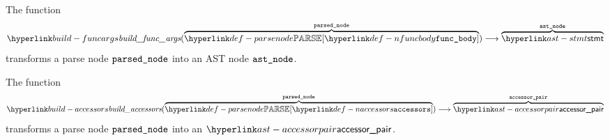 \hypertarget{build-funcbody}{}
The function
\[
\buildfuncargs(\overname{\parsenode{\Nfuncbody}}{\vparsednode}) \aslto
  \overname{\stmt}{\vastnode}
\]
transforms a parse node $\vparsednode$ into an AST node $\vastnode$.

\begin{mathpar}
\end{mathpar}

\hypertarget{build-accessors}{}
The function
\[
\buildaccessors(\overname{\parsenode{\Naccessors}}{\vparsednode}) \aslto
  \overname{\accessorpair}{\vaccessorpair}
\]
transforms a parse node $\vparsednode$ into an $\accessorpair$.

\begin{mathpar}
\end{mathpar}

